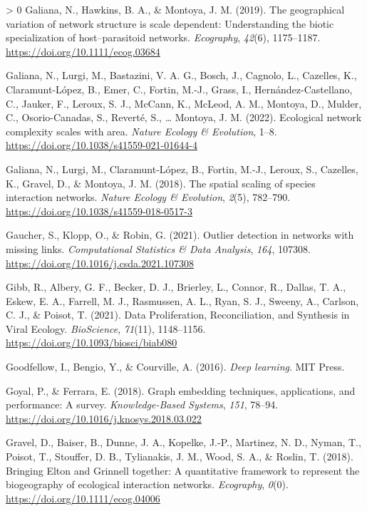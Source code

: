 \documentclass[11pt]{article}
\newlength{\cslhangindent}
\newenvironment{CSLReferences}[3] %
 {%
  \setlength{\parindent}{0pt}
  \ifodd #1 \everypar{\setlength{\hangindent}{\cslhangindent}}\ignorespaces\fi
  \ifnum #2 > 0
  \setlength{\parskip}{#2\baselineskip}
  \fi
 }%
 {}
\begin{document}
\begin{CSLReferences}{1}{0}
\leavevmode\hypertarget{ref-Galiana2019GeoVar}{}%
Galiana, N., Hawkins, B. A., \& Montoya, J. M. (2019). The geographical
variation of network structure is scale dependent: Understanding the
biotic specialization of host--parasitoid networks. \emph{Ecography},
\emph{42}(6), 1175--1187. \url{https://doi.org/10.1111/ecog.03684}

\leavevmode\hypertarget{ref-Galiana2022EcoNet}{}%
Galiana, N., Lurgi, M., Bastazini, V. A. G., Bosch, J., Cagnolo, L.,
Cazelles, K., Claramunt-López, B., Emer, C., Fortin, M.-J., Grass, I.,
Hernández-Castellano, C., Jauker, F., Leroux, S. J., McCann, K., McLeod,
A. M., Montoya, D., Mulder, C., Osorio-Canadas, S., Reverté, S.,
\ldots{} Montoya, J. M. (2022). Ecological network complexity scales
with area. \emph{Nature Ecology \& Evolution}, 1--8.
\url{https://doi.org/10.1038/s41559-021-01644-4}

\leavevmode\hypertarget{ref-Galiana2018SpaSca}{}%
Galiana, N., Lurgi, M., Claramunt-López, B., Fortin, M.-J., Leroux, S.,
Cazelles, K., Gravel, D., \& Montoya, J. M. (2018). The spatial scaling
of species interaction networks. \emph{Nature Ecology \& Evolution},
\emph{2}(5), 782--790. \url{https://doi.org/10.1038/s41559-018-0517-3}

\leavevmode\hypertarget{ref-Gaucher2021OutDet}{}%
Gaucher, S., Klopp, O., \& Robin, G. (2021). Outlier detection in
networks with missing links. \emph{Computational Statistics \& Data
Analysis}, \emph{164}, 107308.
\url{https://doi.org/10.1016/j.csda.2021.107308}

\leavevmode\hypertarget{ref-Gibb2021DatPro}{}%
Gibb, R., Albery, G. F., Becker, D. J., Brierley, L., Connor, R.,
Dallas, T. A., Eskew, E. A., Farrell, M. J., Rasmussen, A. L., Ryan, S.
J., Sweeny, A., Carlson, C. J., \& Poisot, T. (2021). Data
Proliferation, Reconciliation, and Synthesis in Viral Ecology.
\emph{BioScience}, \emph{71}(11), 1148--1156.
\url{https://doi.org/10.1093/biosci/biab080}

\leavevmode\hypertarget{ref-Goodfellow2016DeeLea}{}%
Goodfellow, I., Bengio, Y., \& Courville, A. (2016). \emph{Deep
learning}. MIT Press.

\leavevmode\hypertarget{ref-Goyal2018GraEmb}{}%
Goyal, P., \& Ferrara, E. (2018). Graph embedding techniques,
applications, and performance: A survey. \emph{Knowledge-Based Systems},
\emph{151}, 78--94. \url{https://doi.org/10.1016/j.knosys.2018.03.022}

\leavevmode\hypertarget{ref-Gravel2018BriElt}{}%
Gravel, D., Baiser, B., Dunne, J. A., Kopelke, J.-P., Martinez, N. D.,
Nyman, T., Poisot, T., Stouffer, D. B., Tylianakis, J. M., Wood, S. A.,
\& Roslin, T. (2018). Bringing Elton and Grinnell together: A
quantitative framework to represent the biogeography of ecological
interaction networks. \emph{Ecography}, \emph{0}(0).
\url{https://doi.org/10.1111/ecog.04006}


\end{CSLReferences}
\end{document}
